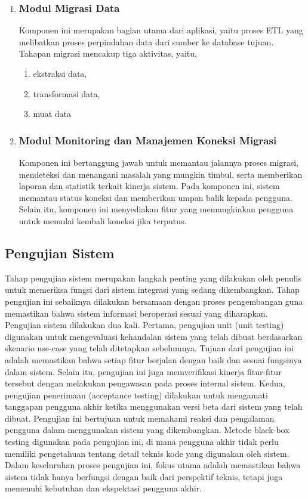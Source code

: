 \begin{enumerate}
  \item \subsubsection*{Modul Migrasi Data}
  Komponen ini merupakan bagian utama dari aplikasi, yaitu proses ETL yang melibatkan proses perpindahan data dari sumber ke database tujuan. Tahapan migrasi mencakup tiga aktivitas, yaitu,
    \begin{enumerate}
      \item ekstraksi data,
      \item transformasi data,
      \item muat data
    \end{enumerate}
  
  \item \subsubsection*{Modul Monitoring dan Manajemen Koneksi Migrasi}
  Komponen ini bertanggung jawab untuk memantau jalannya proses migrasi, mendeteksi dan menangani masalah yang mungkin timbul, serta memberikan laporan dan statistik terkait kinerja sistem. Pada komponen ini, sistem memantau status koneksi dan memberikan umpan balik kepada pengguna. Selain itu, komponen ini menyediakan fitur yang memungkinkan pengguna untuk memulai kembali koneksi jika terputus.
\end{enumerate}


\subsection{Pengujian Sistem}
Tahap pengujian sistem merupakan langkah penting yang dilakukan oleh penulis untuk memeriksa fungsi dari sistem integrasi yang sedang dikembangkan. Tahap pengujian ini sebaiknya dilakukan bersamaan dengan proses pengembangan guna memastikan bahwa sistem informasi beroperasi sesuai yang diharapkan. Pengujian sistem dilakukan dua kali. Pertama, pengujian unit (unit testing) digunakan untuk mengevaluasi kehandalan sistem yang telah dibuat berdasarkan skenario use-case yang telah ditetapkan sebelumnya. Tujuan dari pengujian ini adalah memastikan bahwa setiap fitur berjalan dengan baik dan sesuai fungsinya dalam sistem. Selain itu, pengujian ini juga memverifikasi kinerja fitur-fitur tersebut dengan melakukan pengawasan pada proses internal sistem. Kedua, pengujian penerimaan (acceptance testing) dilakukan untuk mengamati tanggapan pengguna akhir ketika menggunakan versi beta dari sistem yang telah dibuat. Pengujian ini bertujuan untuk memahami reaksi dan pengalaman pengguna dalam menggunakan sistem yang dikembangkan. Metode black-box testing digunakan pada pengujian ini, di mana pengguna akhir tidak perlu memiliki pengetahuan tentang detail teknis kode yang digunakan oleh sistem. Dalam keseluruhan proses pengujian ini, fokus utama adalah memastikan bahwa sistem tidak hanya berfungsi dengan baik dari perspektif teknis, tetapi juga memenuhi kebutuhan dan ekspektasi pengguna akhir.

